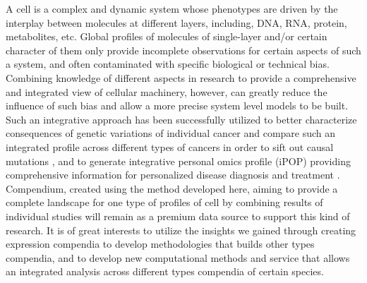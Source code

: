 
A cell is a complex and dynamic system whose phenotypes are driven by
the interplay between molecules at different layers, including, DNA,
RNA, protein, metabolites, etc.
%
Global profiles of molecules of single-layer and/or certain character
of them only provide incomplete observations for certain aspects of
such a system, and often contaminated with specific biological or
technical bias.
%
Combining knowledge of different aspects in research to provide a
comprehensive and integrated view of cellular machinery, however, can
greatly reduce the influence of such bias and allow a more precise
system level models to be built.
%
%
Such an integrative approach has been successfully utilized 
to better characterize consequences of genetic variations of
individual cancer and compare such an integrated profile across
different types of cancers in order to sift out causal mutations
\cite{Weinstein2013}, and to generate integrative personal omics
profile (iPOP) providing comprehensive information for personalized
disease diagnosis and treatment \cite{Chen2012}.
%
Compendium, created using the method developed here, aiming to provide
a complete landscape for one type of profiles of cell by combining
results of individual studies will remain as a premium data source to
support this kind of research.
%
It is of great interests to utilize the insights we gained through
creating expression compendia to develop methodologies that builds
other types compendia, and to develop new computational methods and
service that allows an integrated analysis across different types
compendia of certain species.





